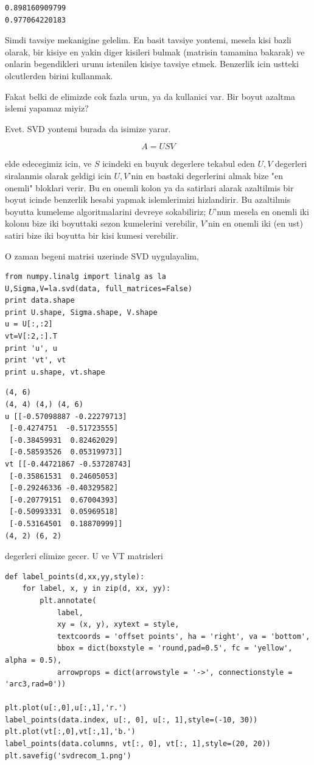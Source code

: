 \documentclass[12pt,fleqn]{article}\usepackage{../common}
\begin{document}
\begin{verbatim}
0.898160909799
0.977064220183
\end{verbatim}

Simdi tavsiye mekanigine gelelim. En basit tavsiye yontemi, mesela
kisi bazli olarak, bir kisiye en yakin diger kisileri bulmak (matrisin
tamamina bakarak) ve onlarin begendikleri urunu istenilen kisiye
tavsiye etmek. Benzerlik icin ustteki olcutlerden birini kullanmak.

Fakat belki de elimizde cok fazla urun, ya da kullanici var. Bir boyut
azaltma islemi yapamaz miyiz?

Evet. SVD yontemi burada da isimize yarar. 

$$ A = USV  $$

elde edecegimiz icin, ve $S$ icindeki en buyuk degerlere tekabul eden
$U,V$ degerleri siralanmis olarak geldigi icin $U,V$'nin en bastaki
degerlerini almak bize "en onemli" bloklari verir. Bu en onemli kolon
ya da satirlari alarak azaltilmis bir boyut icinde benzerlik hesabi
yapmak islemlerimizi hizlandirir. Bu azaltilmis boyutta kumeleme
algoritmalarini devreye sokabiliriz; $U$'nun mesela en onemli iki
kolonu bize iki boyuttaki sezon kumelerini verebilir, $V$'nin en
onemli iki (en ust) satiri bize iki boyutta bir kisi kumesi verebilir.

O zaman begeni matrisi uzerinde SVD uygulayalim,

\begin{verbatim}
from numpy.linalg import linalg as la
U,Sigma,V=la.svd(data, full_matrices=False)
print data.shape
print U.shape, Sigma.shape, V.shape
u = U[:,:2]
vt=V[:2,:].T
print 'u', u
print 'vt', vt
print u.shape, vt.shape
\end{verbatim}

\begin{verbatim}
(4, 6)
(4, 4) (4,) (4, 6)
u [[-0.57098887 -0.22279713]
 [-0.4274751  -0.51723555]
 [-0.38459931  0.82462029]
 [-0.58593526  0.05319973]]
vt [[-0.44721867 -0.53728743]
 [-0.35861531  0.24605053]
 [-0.29246336 -0.40329582]
 [-0.20779151  0.67004393]
 [-0.50993331  0.05969518]
 [-0.53164501  0.18870999]]
(4, 2) (6, 2)
\end{verbatim}

degerleri elimize gecer. U ve VT matrisleri 

\begin{verbatim}
def label_points(d,xx,yy,style):
    for label, x, y in zip(d, xx, yy):
        plt.annotate(
            label, 
            xy = (x, y), xytext = style,
            textcoords = 'offset points', ha = 'right', va = 'bottom',
            bbox = dict(boxstyle = 'round,pad=0.5', fc = 'yellow', alpha = 0.5),
            arrowprops = dict(arrowstyle = '->', connectionstyle = 'arc3,rad=0'))

plt.plot(u[:,0],u[:,1],'r.')
label_points(data.index, u[:, 0], u[:, 1],style=(-10, 30))
plt.plot(vt[:,0],vt[:,1],'b.')
label_points(data.columns, vt[:, 0], vt[:, 1],style=(20, 20))
plt.savefig('svdrecom_1.png')
\end{verbatim}
\end{document}
